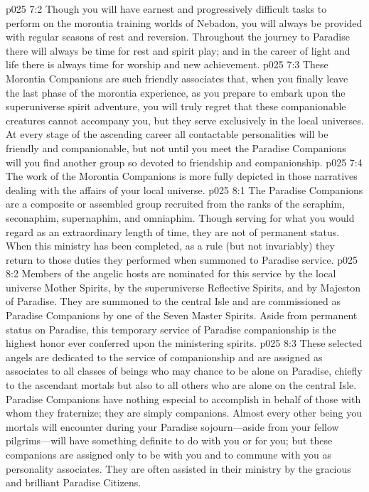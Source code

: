 \vs p025 7:2 Though you will have earnest and progressively difficult tasks to perform on the morontia training worlds of Nebadon, you will always be provided with regular seasons of rest and reversion. Throughout the journey to Paradise there will always be time for rest and spirit play; and in the career of light and life there is always time for worship and new achievement.
\vs p025 7:3 These Morontia Companions are such friendly associates that, when you finally leave the last phase of the morontia experience, as you prepare to embark upon the superuniverse spirit adventure, you will truly regret that these companionable creatures cannot accompany you, but they serve exclusively in the local universes. At every stage of the ascending career all contactable personalities will be friendly and companionable, but not until you meet the Paradise Companions will you find another group so devoted to friendship and companionship.
\vs p025 7:4 The work of the Morontia Companions is more fully depicted in those narratives dealing with the affairs of your local universe.
\vs p025 8:1 The Paradise Companions are a composite or assembled group recruited from the ranks of the seraphim, seconaphim, supernaphim, and omniaphim. Though serving for what you would regard as an extraordinary length of time, they are not of permanent status. When this ministry has been completed, as a rule (but not invariably) they return to those duties they performed when summoned to Paradise service.
\vs p025 8:2 Members of the angelic hosts are nominated for this service by the local universe Mother Spirits, by the superuniverse Reflective Spirits, and by Majeston of Paradise. They are summoned to the central Isle and are commissioned as Paradise Companions by one of the Seven Master Spirits. Aside from permanent status on Paradise, this temporary service of Paradise companionship is the highest honor ever conferred upon the ministering spirits.
\vs p025 8:3 These selected angels are dedicated to the service of companionship and are assigned as associates to all classes of beings who may chance to be alone on Paradise, chiefly to the ascendant mortals but also to all others who are alone on the central Isle. Paradise Companions have nothing especial to accomplish in behalf of those with whom they fraternize; they are simply companions. Almost every other being you mortals will encounter during your Paradise sojourn---aside from your fellow pilgrims---will have something definite to do with you or for you; but these companions are assigned only to be with you and to commune with you as personality associates. They are often assisted in their ministry by the gracious and brilliant Paradise Citizens.
